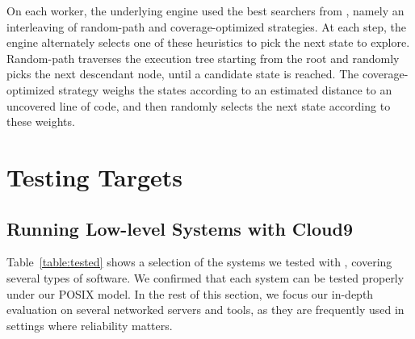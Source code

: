 On each worker, the underlying \klee engine used the best searchers from \cite{klee}, namely an interleaving of random-path and coverage-optimized strategies. At each step, the engine alternately selects one of these heuristics to pick the next state to explore. Random-path traverses the execution tree starting from the root and randomly picks the next descendant node, until a candidate state is reached. The coverage-optimized strategy weighs the states according to an estimated distance to an uncovered line of code, and then randomly selects the next state according to these weights.


\section{Testing Targets}
\label{sec:eval:targets}

\subsection{Running Low-level Systems with Cloud9}

Table~\ref{table:tested} shows a selection of the systems we tested with \cnine, covering several types of software.  We confirmed that each system can be tested properly under our POSIX model. In the rest of this section, we focus our in-depth evaluation on several networked servers and tools, as they are frequently used in settings where reliability matters.

